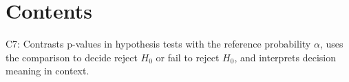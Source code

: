 



\section*{Contents}
\setcounter{tocdepth}{2}
\setcounter{secnumdepth}{1}
\tableofcontents

\begin{ExamCriteria}
    \item C7: Contrasts p-values in hypothesis tests with the reference probability \(\alpha\), uses the comparison to decide reject \(H_0\) or fail to reject \(H_0\), and interprets decision meaning in context.
\end{ExamCriteria}

